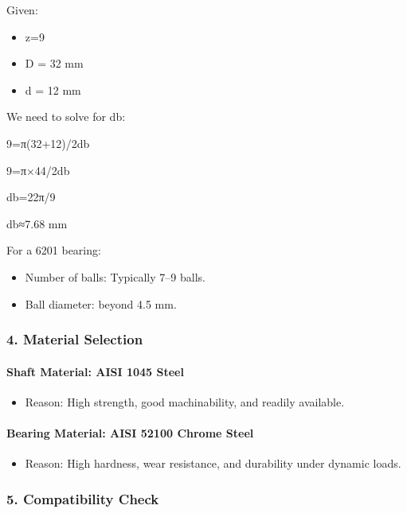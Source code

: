 \documentclass[../../main]{subfiles}
\begin{document}
Given:

\begin{itemize}
\item
  z=9
\item
  D = 32 mm
\item
  d = 12 mm
\end{itemize}

We need to solve for db:

9=π(32+12)/2db

9=π×44/2db

db=22π/9

db≈7.68 mm

For a 6201 bearing:

\begin{itemize}
\item
  Number of balls: Typically 7--9 balls.
\item
  Ball diameter: beyond 4.5 mm.
\end{itemize}

\subsubsection{\texorpdfstring{\textbf{4. Material
Selection}}{4. Material Selection}}\label{material-selection}

\paragraph{\texorpdfstring{\textbf{Shaft Material: AISI 1045
Steel}}{Shaft Material: AISI 1045 Steel}}\label{shaft-material-aisi-1045-steel}

\begin{itemize}
\item
  Reason: High strength, good machinability, and readily available.
\end{itemize}

\paragraph{\texorpdfstring{\textbf{Bearing Material: AISI 52100 Chrome
Steel}}{Bearing Material: AISI 52100 Chrome Steel}}\label{bearing-material-aisi-52100-chrome-steel}

\begin{itemize}
\item
  Reason: High hardness, wear resistance, and durability under dynamic
  loads.
\end{itemize}

\subsubsection{\texorpdfstring{\textbf{5. Compatibility
Check}}{5. Compatibility Check}}\label{compatibility-check}
\end{document}
